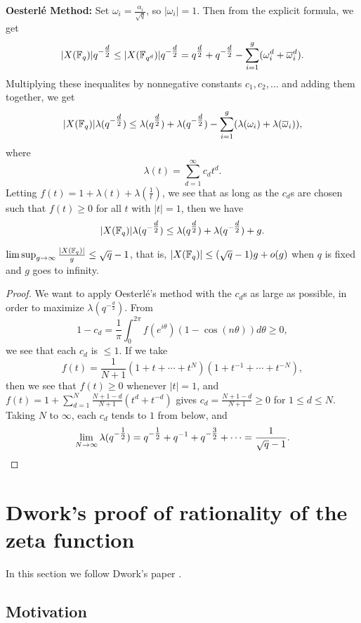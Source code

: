 {\bf Oesterl\'e Method:} Set $\omega_i = \frac{\alpha_i}{\sqrt{q}}$, so $|\omega_i| = 1$. Then from the explicit formula, we get
\[
|X(\mathbb{F}_q)|q^{-\tfrac{d}{2}} \le |X(\mathbb{F}_{q^d})|q^{-\tfrac{d}{2}} = q^{\tfrac{d}{2}} + q^{-\tfrac{d}{2}} - \sum_{i=1}^g (\omega_i^d+\overline{\omega}_i^d).
\]
Multiplying these inequalites by nonnegative constants $c_1, c_2, ...$ and adding them together, we get
\[
|X(\mathbb{F}_q)|\lambda(q^{-\tfrac{d}{2}}) \le \lambda(q^{\tfrac{d}{2}}) + \lambda(q^{-\tfrac{d}{2}}) - \sum_{i=1}^g (\lambda(\omega_i) + \lambda(\overline{\omega}_i)),
\]
where
\[
\lambda(t) = \sum_{d=1}^{\infty} c_dt^d.
\]
Letting $f(t) = 1 + \lambda(t) + \lambda(\tfrac{1}{t})$, we see that as long as the $c_d$s are chosen such that $f(t) \ge 0$ for all $t$ with $|t| = 1$, then we have
\[
|X(\mathbb{F}_q)|\lambda(q^{-\tfrac{d}{2}}) \le \lambda(q^{\tfrac{d}{2}}) + \lambda(q^{-\tfrac{d}{2}}) + g.
\]

\begin{thm} $\limsup_{g\rightarrow \infty} \frac{|X(\mathbb{F}_q)|}{g} \le \sqrt{q}-1$, that is, $|X(\mathbb{F}_q)| \le (\sqrt{q}-1)g + o(g)$ when $q$ is fixed and $g$ goes to infinity.
\end{thm}
\begin{proof} We want to apply Oesterl\'e's method with the $c_d$s as large as possible, in order to maximize $\lambda(q^{-\frac{d}{2}})$. From
\[
1-c_d = \frac{1}{\pi}\int_0^{2\pi} f(e^{i\theta})(1-\cos(n\theta))d\theta \ge 0,
\]
we see that each $c_d$ is $\le 1$. If we take
\[
f(t) = \frac{1}{N+1}(1+t+\cdots + t^N)(1+t^{-1}+\cdots + t^{-N}),
\]
then we see that $f(t) \ge 0$ whenever $|t| = 1$, and $f(t) = 1 + \sum_{d=1}^N \frac{N+1-d}{N+1}(t^d + t^{-d})$ gives $c_d = \frac{N+1-d}{N+1} \ge 0$ for $1 \le d \le N$. Taking $N$ to $\infty$, each $c_d$ tends to $1$ from below, and
\[
\lim_{N\rightarrow\infty} \lambda(q^{-\tfrac{1}{2}}) = q^{-\tfrac{1}{2}} + q^{-1} + q^{-\tfrac{3}{2}} + \cdots = \frac{1}{\sqrt{q}-1}.\qedhere
\]
\end{proof}


\section{Dwork's proof of rationality of the zeta function}

In this section we follow Dwork's paper \cite{dwork}.

\subsection{Motivation}

